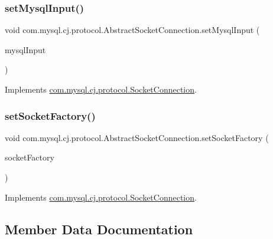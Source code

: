\subsubsection{\texorpdfstring{set\+Mysql\+Input()}{setMysqlInput()}}
{\footnotesize\ttfamily void com.\+mysql.\+cj.\+protocol.\+Abstract\+Socket\+Connection.\+set\+Mysql\+Input (\begin{DoxyParamCaption}\item[{Input\+Stream}]{mysql\+Input }\end{DoxyParamCaption})}



Implements \mbox{\hyperlink{interfacecom_1_1mysql_1_1cj_1_1protocol_1_1_socket_connection_a0b307f24afb5f5e1090f2b2f99f13cf5}{com.\+mysql.\+cj.\+protocol.\+Socket\+Connection}}.

\mbox{\label{classcom_1_1mysql_1_1cj_1_1protocol_1_1_abstract_socket_connection_a33c399d3a62154183561e8807bf4dcc5}} 
\subsubsection{\texorpdfstring{set\+Socket\+Factory()}{setSocketFactory()}}
{\footnotesize\ttfamily void com.\+mysql.\+cj.\+protocol.\+Abstract\+Socket\+Connection.\+set\+Socket\+Factory (\begin{DoxyParamCaption}\item[{\mbox{\hyperlink{interfacecom_1_1mysql_1_1cj_1_1protocol_1_1_socket_factory}{Socket\+Factory}}}]{socket\+Factory }\end{DoxyParamCaption})}



Implements \mbox{\hyperlink{interfacecom_1_1mysql_1_1cj_1_1protocol_1_1_socket_connection_af9beff82797b546cca32590719ad2d15}{com.\+mysql.\+cj.\+protocol.\+Socket\+Connection}}.



\subsection{Member Data Documentation}
\mbox{\label{classcom_1_1mysql_1_1cj_1_1protocol_1_1_abstract_socket_connection_af14504cb2ea0f50ee8270b183390703d}} 
